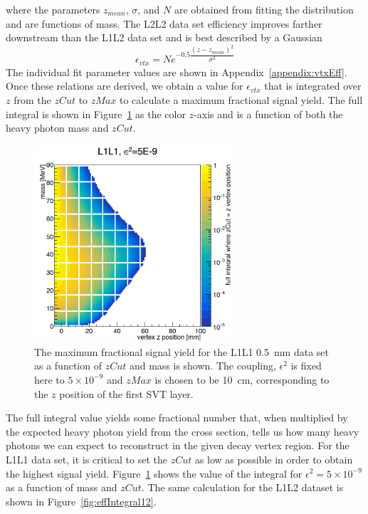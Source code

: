 where the parameters $z_{mean}$, $\sigma$, and $N$ are obtained from fitting the distribution and are functions of mass. The L2L2 data set efficiency improves farther downstream than the L1L2 data set and is best described by a Gaussian 
\begin{equation}
\label{eq:gausfunction}
\epsilon_{vtx} = Ne^{-0.5\dfrac{(z-z_{mean})^2}{\sigma^2}}
\end{equation}
The individual fit parameter values are shown in Appendix~\ref{appendix:vtxEff}.\\
\indent Once these relations are derived, we obtain a value for $\epsilon_{vtx}$ that is integrated over $z$ from the $zCut$ to $zMax$ to calculate a maximum fractional signal yield. The full integral is shown in Figure~\ref{fig:effIntegral} as the color $z$-axis and is a function of both the heavy photon mass and $zCut$.  
\begin{figure}[htb]
  \centering
      \includegraphics[width=0.65\textwidth]{pics/searching/integralEffL1L1.png}
  \caption[Integral as a function of mass and $zCut$ for L1L1]{The maximum fractional signal yield for the L1L1 0.5~mm data set as a function of $zCut$ and mass is shown. The coupling, $\epsilon^2$ is fixed here to $5\times10^{-9}$ and $zMax$ is chosen to be 10~cm, corresponding to the $z$ position of the first SVT layer. }
  \label{fig:effIntegral}
\end{figure}
The full integral value yields some fractional number that, when multiplied by the expected heavy photon yield from the cross section, tells us how many heavy photons we can expect to reconstruct in the given decay vertex region. For the L1L1 data set, it is critical to set the $zCut$ as low as possible in order to obtain the highest signal yield. Figure~\ref{fig:effIntegral} shows the value of the integral for $\epsilon^{2} = 5\times10^{-9}$ as a function of mass and $zCut$. The same calculation for the L1L2 dataset is shown in Figure~\ref{fig:effIntegral12}.
